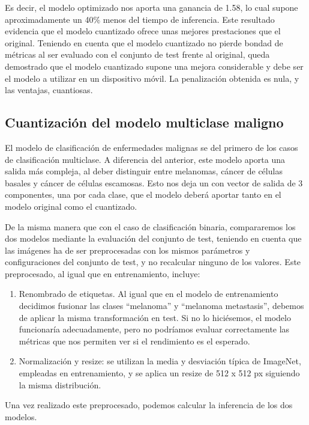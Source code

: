 Es decir, el modelo optimizado nos aporta una ganancia de 1.58, lo cual supone aproximadamente un 40\% menos del tiempo de inferencia. Este resultado evidencia que el modelo cuantizado ofrece unas mejores prestaciones que el original. Teniendo en cuenta que el modelo cuantizado no pierde bondad de métricas al ser evaluado con el conjunto de test frente al original, queda demostrado que el modelo cuantizado supone una mejora considerable y debe ser el modelo a utilizar en un dispositivo móvil. La penalización obtenida es nula, y las ventajas, cuantiosas.

\subsection{Cuantización del modelo multiclase maligno}

El modelo de clasificación de enfermedades malignas se del primero de los casos de clasificación multiclase. A diferencia del anterior, este modelo aporta una salida más compleja, al deber distinguir entre melanomas, cáncer de células basales y cáncer de células escamosas. Esto nos deja un con vector de salida de 3 componentes, una por cada clase, que el modelo deberá aportar tanto en el modelo original como el cuantizado.

De la misma manera que con el caso de clasificación binaria, compararemos los dos modelos mediante la evaluación del conjunto de test, teniendo en cuenta que las imágenes ha de ser preprocesadas con los mismos parámetros y configuraciones del conjunto de test, y no recalcular ninguno de los valores. Este preprocesado, al igual que en entrenamiento, incluye:

\begin{enumerate}
	\item Renombrado de etiquetas. Al igual que en el modelo de entrenamiento decidimos fusionar las clases ``melanoma'' y ``melanoma metastasis'', debemos de aplicar la misma transformación en test. Si no lo hiciésemos, el modelo funcionaría adecuadamente, pero no podríamos evaluar correctamente las métricas que nos permiten ver si el rendimiento es el esperado.
	 \item Normalización y resize: se utilizan la media y desviación típica de ImageNet\cite{5206848}, empleadas en entrenamiento, y se aplica un resize de 512 x 512 px siguiendo la misma distribución.
\end{enumerate}

Una vez realizado este preprocesado, podemos calcular la inferencia de los dos modelos.


